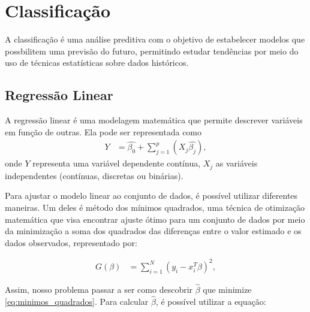 \section{Classificação}

A classificação é uma análise preditiva com o objetivo de estabelecer modelos que possbilitem uma previsão do futuro, permitindo estudar tendências por meio do uso de técnicas estatísticas sobre dados históricos.

\subsection{Regressão Linear}


A regressão linear é uma modelagem matemática \footnotemark {} que permite descrever variáveis em função de outras. Ela pode ser representada como
\begin{equation}
  \label{eq:regressao_linear}
  \begin{aligned}
Y &= \hat{\beta_{0}} + \sum_{j=1}^{p} (X_{j}\hat{\beta_{j}}), 
  \end{aligned}  
\end{equation}
onde \begin{math}Y\end{math} representa uma variável dependente contínua, \begin{math}X_{j}\end{math} as variáveis independentes (contínuas, discretas ou binárias).

Para ajustar o modelo linear ao conjunto de dados, é possível utilizar diferentes maneiras. Um deles é método dos mínimos quadrados, uma técnica de otimização matemática que visa encontrar ajuste ótimo para um conjunto de dados por meio da minimização a soma dos quadrados das diferenças entre o valor estimado e os dados observados, representado por:

\begin{equation}
  \label{eq:minimos_quadrados}
  \begin{aligned}
G(\beta) &= \sum_{i=1}^{N} (y_{i}-x_{i}^{T}\beta)^{2}, 
  \end{aligned}  
\end{equation}

Assim, nosso problema passar a ser como descobrir \begin{math}\hat{\beta}\end{math} que minimize \ref{eq:minimos_quadrados}. Para calcular \begin{math}\hat{\beta}\end{math}, é possível utilizar a equação:

